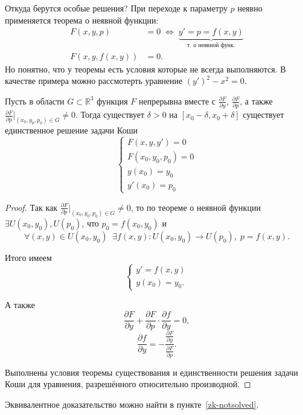 \begin{lemmanote}
Откуда берутся особые решения? При переходе к параметру $p$ неявно применяется теорема о неявной функции:
\begin{align*}
    F(x, y, p) &= 0 \; \Longleftrightarrow \; \underbrace{y' = p = f(x, y)}_{\text{т. о неявной функ.}}\\
    F(x, y, f(x, y)) &= 0.
\end{align*}
Но понятно, что у теоремы есть условия которые не всегда выполняются. В качестве примера можно рассмотерть уравнение $(y')^2 - x^2 = 0$.
\end{lemmanote}

\begin{theorem}
Пусть в области $G \subset \mathbb{R}^3$ функция $F$ непрерывна вместе с $\frac{\partial F}{\partial y}$, $\frac{\partial F}{\partial p}$, а также $\frac{\partial F}{\partial p}|_{(x_0, y_0, p_0) \in G} \neq 0$.
Тогда существует $\delta > 0$ на $[x_0 - \delta, x_0 + \delta]$ существует единственное решение задачи Коши
\[
\begin{cases}
F(x, y, y') = 0\\
F(x_0, y_0, p_0) = 0\\
y(x_0) = y_0\\
y'(x_0) = p_0
\end{cases}
\]
\end{theorem}
\begin{proof}
Так как $\frac{\partial F}{\partial p}|_{(x_0, y_0, p_0) \in G} \neq 0$, то по теореме о неявной функции $\exists U(x_0, y_0), U(p_0)$, что $p_0 = f(x_0, y_0)$ и 
\[\forall (x, y) \in U(x_0, y_0)\;\; \exists f(x, y): U(x_0, y_0) \rightarrow U(p_0), \; p = f(x, y).\]

Итого имеем
\[
\begin{cases}
y' = f(x, y)\\
y(x_0) = y_0.
\end{cases}
\]

А также
\[
\frac{\partial F}{\partial y} + \frac{\partial F}{\partial p} \cdot \frac{\partial f}{\partial y} = 0,
\]
\[
\frac{\partial f}{\partial y} = - \frac{\frac{\partial F}{\partial y}}{ \frac{\partial F}{\partial p} }.
\]

Выполнены условия теоремы существования и единственности решения задачи Коши для уравнения, разрешённого относительно производной.
\end{proof}
Эквивалентное доказательство можно найти в пункте~\ref{zk-notsolved}.